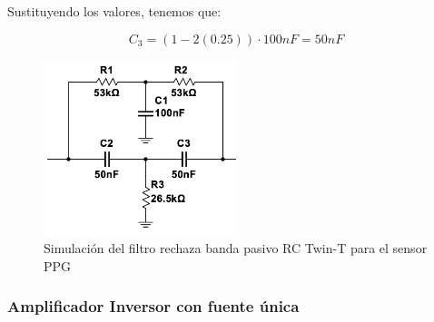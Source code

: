        Sustituyendo los valores, tenemos que:

        \begin{equation}
            C_3 = (1 - 2(0.25)) \cdot 100 nF = 50 nF
        \end{equation}

        \begin{figure}[H]
            \centering
            \includegraphics[width=0.5\textwidth]{img/Desarrollo/multisim_rechazaBandas.png}
            \caption[Simulación del filtro rechaza banda pasivo RC Twin-T para el sensor PPG.]{Simulación del filtro rechaza banda pasivo RC Twin-T para el sensor PPG\footnotemark}
            \label{fig:Simulacion_Filtro_Rechaza_Banda_PPG}
        \end{figure}

        \subsubsection{Amplificador Inversor con fuente única}
